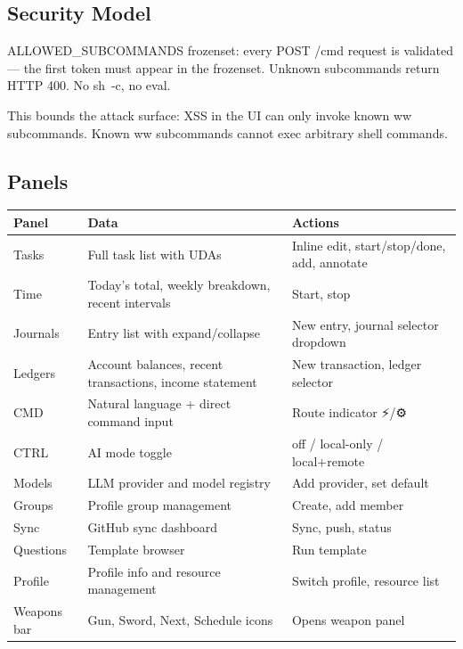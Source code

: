\documentclass[11pt, a4paper, DIV=14]{scrartcl}
\renewcommand{\texttt}[1]{{\ttfamily\fontsize{8.5}{10.5}\selectfont\color{BabbNavy}#1}}
\newcounter{none}
\begin{document}
\subsection{Security Model}\label{security-model}

\texttt{ALLOWED\_SUBCOMMANDS} frozenset: every POST /cmd request is
validated --- the first token must appear in the frozenset. Unknown
subcommands return HTTP 400. No \texttt{sh\ -c}, no eval.

This bounds the attack surface: XSS in the UI can only invoke known ww
subcommands. Known ww subcommands cannot exec arbitrary shell commands.

\subsection{Panels}\label{panels}

{\def\LTcaptype{none} %
\begin{longtable}[]{@{}
  >{\raggedright\arraybackslash}p{}
  >{\raggedright\arraybackslash}p{}
  >{\raggedright\arraybackslash}p{}@{}}
\toprule\noalign{}
\begin{minipage}[b]{\linewidth}\raggedright
Panel
\end{minipage} & \begin{minipage}[b]{\linewidth}\raggedright
Data
\end{minipage} & \begin{minipage}[b]{\linewidth}\raggedright
Actions
\end{minipage} \\
\midrule\noalign{}
\endhead
\bottomrule\noalign{}
\endlastfoot
Tasks & Full task list with UDAs & Inline edit, start/stop/done, add,
annotate \\
Time & Today's total, weekly breakdown, recent intervals & Start,
stop \\
Journals & Entry list with expand/collapse & New entry, journal selector
dropdown \\
Ledgers & Account balances, recent transactions, income statement & New
transaction, ledger selector \\
CMD & Natural language + direct command input & Route indicator ⚡/⚙ \\
CTRL & AI mode toggle & off / local-only / local+remote \\
Models & LLM provider and model registry & Add provider, set default \\
Groups & Profile group management & Create, add member \\
Sync & GitHub sync dashboard & Sync, push, status \\
Questions & Template browser & Run template \\
Profile & Profile info and resource management & Switch profile,
resource list \\
Weapons bar & Gun, Sword, Next, Schedule icons & Opens weapon panel \\
\end{longtable}
}
\end{document}
